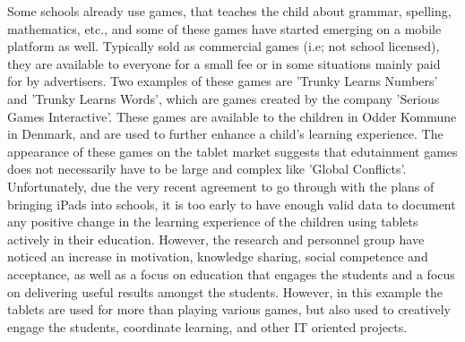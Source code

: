 Some schools already use games, that teaches the child about grammar, spelling, mathematics, etc., and some of these games have started emerging on a mobile platform as well.
Typically sold as commercial games (i.e; not school licensed), they are available to everyone for a small fee or in some situations mainly paid for by advertisers.
Two examples of these games are 'Trunky Learns Numbers' and 'Trunky Learns Words', which are games created by the company 'Serious Games Interactive'.
These games are available to the children in Odder Kommune in Denmark, and are used to further enhance a child's learning experience.\cite{odderipad}
The appearance of these games on the tablet market suggests that edutainment games does not necessarily have to be large and complex like 'Global Conflicts'.
Unfortunately, due the very recent agreement to go through with the plans of bringing iPads into schools, it is too early to have enough valid data to document any positive change in the learning experience of the children using tablets actively in their education.
However, the research and personnel group have noticed an increase in motivation, knowledge sharing, social competence and acceptance, as well as a focus on education that engages the students and a focus on delivering useful results amongst the students.\cite{odderipadpjece}
However, in this example the tablets are used for more than playing various games, but also used to creatively engage the students, coordinate learning, and other IT oriented projects.\cite{odderipadpjece}